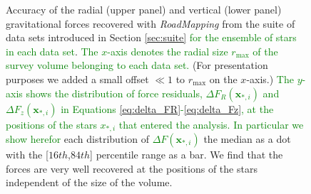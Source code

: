\documentclass[iop,revtex4,numberedappendix,appendixfloats]{emulateapj}
\newcommand{\vect}[1]{\boldsymbol{#1}}
\newcommand{\RM}{{\sl RoadMapping}}
\newcommand{\NEW}[1]{\textcolor{Green}{#1}}
\newcommand{\OLD}[1]{}
\begin{document}
\begin{figure}[!htbp]
  \caption{Accuracy of the radial (upper panel\OLD{s}) and vertical (lower panel\OLD{s}) gravitational forces recovered with \RM{} from the suite of data sets introduced in Section \ref{sec:suite}\OLD{, depending on the size $r_\text{max}$ of the survey volume}\NEW{ for the ensemble of stars in each data set}. \NEW{The $x$-axis denotes the radial size $r_\text{max}$ of the survey volume belonging to each data set.} (For presentation purposes we added a small offset $\ll 1$ to $r_\text{max}$ on the $x$-axis.) \NEW{The $y$-axis shows the distribution of force residuals, $\Delta F_{R}(\vect{x}_{*,i})$ and $\Delta F_{z}(\vect{x}_{*,i})$ in Equations \eqref{eq:delta_FR}-\eqref{eq:delta_Fz}, at the positions of the stars $x_{*,i}$ that entered the analysis. In particular we show here}\OLD{The left panels show how well \RM{} recovers the forces for the ensemble of stars in the data set ($\Delta F_{R}(*_i)$ and $\Delta F_{z}(*_i)$ in Equations \eqref{eq:delta_FR}-\eqref{eq:delta_Fz}) and the right panels test the predictive power of each of the data sets' best-fit potential by showing how well the forces are recovered at regular grid points in a large cylinder of $r_\text{max}=5~\text{kpc}$ and height $|z|=1.5~\text{kpc}$ around the survey volumes' center ($\Delta F_{R}(g_j)$ and $\Delta F_{z}(g_j)$ in Equations \eqref{eq:delta_FR_grid}-\eqref{eq:delta_Fz_grid}). For}\NEW{for} each distribution of \OLD{$\Delta F(*_i)$}\NEW{$\Delta F(\vect{x}_{*,i})$} \OLD{and $\Delta F(g_j)$ we show here} the median as a dot with the  [$16th$,$84th$] percentile range as a bar. We find that the forces are very well recovered at the positions of the stars independent of the size of the volume. \OLD{The spiral arms introduce some biases in the overall recovered potential and we need at least a survey volume of $r_\text{max}=3~\text{kpc}$ to get a potential with a reasonable predictive power.}}
\label{fig:forces_bias_a}
\end{figure}
\end{document}
